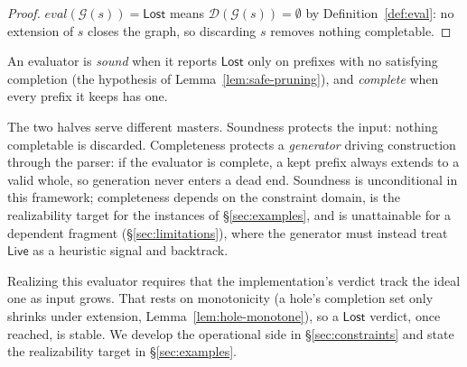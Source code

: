 \begin{proof}
  $\mathit{eval}(\mathcal{G}(s)) = \mathsf{Lost}$ means
  $\mathcal{D}(\mathcal{G}(s)) = \emptyset$ by Definition~\ref{def:eval}: no
  extension of $s$ closes the graph, so discarding $s$ removes nothing
  completable.
\end{proof}

\begin{definition}
  \label{def:pruning-properties}
  An evaluator is \emph{sound} when it reports $\mathsf{Lost}$ only on prefixes
  with no satisfying completion (the hypothesis of
  Lemma~\ref{lem:safe-pruning}), and \emph{complete} when every prefix it keeps
  has one.
\end{definition}

The two halves serve different masters. Soundness protects the input: nothing
completable is discarded. Completeness protects a \emph{generator} driving
construction through the parser: if the evaluator is complete, a kept prefix
always extends to a valid whole, so generation never enters a dead end.
Soundness is unconditional in this framework; completeness depends on the
constraint domain, is the realizability target for the instances of
\S\ref{sec:examples}, and is unattainable for a dependent fragment
(\S\ref{sec:limitations}), where the generator must instead treat
$\mathsf{Live}$ as a heuristic signal and backtrack.

Realizing this evaluator requires that the implementation's verdict track the
ideal one as input grows. That rests on monotonicity (a hole's completion set
only shrinks under extension, Lemma~\ref{lem:hole-monotone}), so a
$\mathsf{Lost}$ verdict, once reached, is stable. We develop the operational
side in \S\ref{sec:constraints} and state the realizability target in
\S\ref{sec:examples}.
